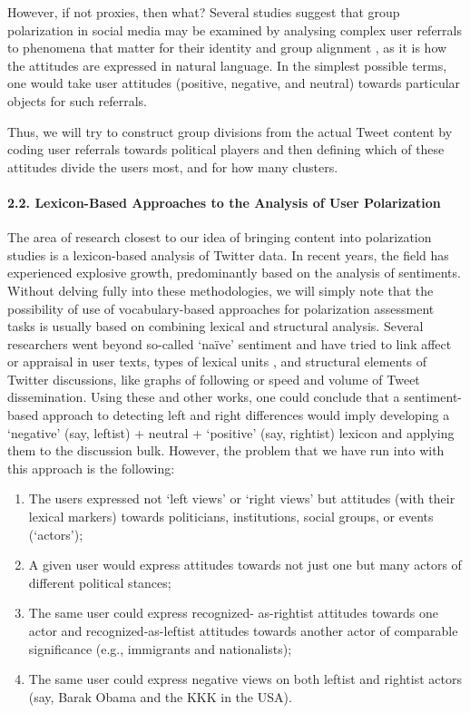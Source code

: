However, if not proxies, then what? Several studies suggest that group polarization in social media may be examined by analysing complex user referrals to phenomena that matter for their identity and group alignment \cite{Evolvi}, as it is how the attitudes are expressed in natural language. In the simplest possible terms, one would take user attitudes (positive, negative, and neutral) towards particular objects for such referrals.

Thus, we will try to construct group divisions from the actual Tweet content by coding user referrals towards political players and then defining which of these attitudes divide the users most, and for how many clusters.

\paragraph{2.2. Lexicon-Based Approaches to the Analysis of User Polarization}

The area of research closest to our idea of bringing content into polarization studies is a lexicon-based analysis of Twitter data. In recent years, the field has experienced explosive growth, predominantly based on the analysis of sentiments. Without delving fully into these methodologies, we will simply note that the possibility of use of vocabulary-based approaches for polarization assessment tasks \cite{HillmanTrier} is usually based on combining lexical and structural analysis. Several researchers went beyond so-called ‘naïve’ sentiment and have tried to link affect \cite{StieglitzDangXuan} or appraisal \cite{DangXuanStieglitzWladarsch} in user texts, types of lexical units \cite{SperiosuSudanUpadhyay}, and structural elements of Twitter discussions, like graphs of following or speed and volume of Tweet dissemination. Using these and other works, one could conclude that a sentiment-based approach to detecting left and right differences would imply developing a ‘negative’ (say, leftist) + neutral + ‘positive’ (say, rightist) lexicon and applying them to the discussion bulk. However, the problem that we have run into with this approach is the following:

\begin{enumerate}
	\item The users expressed not ‘left views’ or ‘right views’ but attitudes (with their lexical markers) towards politicians, institutions, social groups, or events (‘actors’);
	\item A given user would express attitudes towards not just one but many actors of different political stances;
	\item The same user could express recognized- as-rightist attitudes towards one actor and recognized-as-leftist attitudes towards another actor of comparable significance (e.g., immigrants and nationalists);
	\item The same user could express negative views on both leftist and rightist actors (say, Barak Obama and the KKK in the USA).
\end{enumerate}

